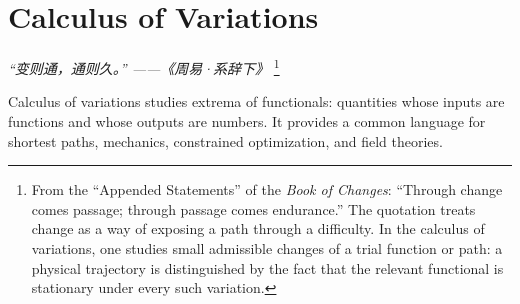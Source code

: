 \chapter{Calculus of Variations}
\renewcommand{\currentchapterpath}{chapters/ch06/}

\begin{flushright}
\textit{“变则通，通则久。” ——《周易·系辞下》}
\footnote{From the ``Appended Statements'' of the 
\textit{Book of Changes}: ``Through change comes passage; 
through passage comes endurance.'' The quotation treats change 
as a way of exposing a path through a difficulty. 
In the calculus of variations, one studies small admissible 
changes of a trial function or path: a physical trajectory is 
distinguished by the fact that the relevant functional is 
stationary under every such variation.}
\end{flushright}

Calculus of variations studies extrema of functionals: quantities whose inputs are functions and whose outputs are numbers. It provides a common language for shortest paths, mechanics, constrained optimization, and field theories.

